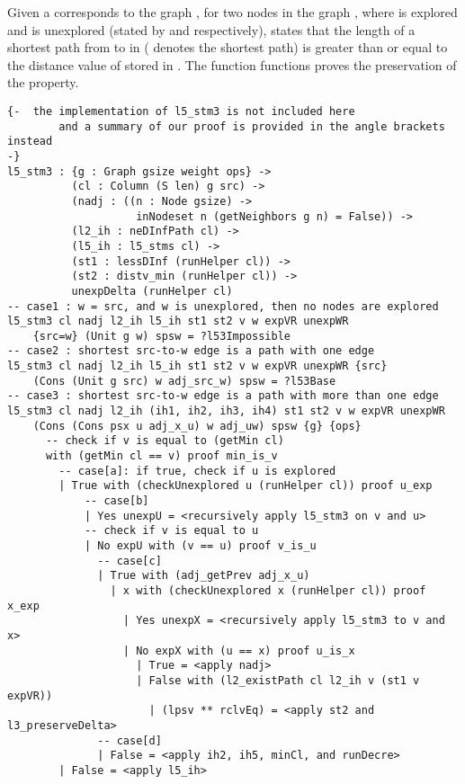 Given a   corresponds to the graph , for two nodes  in the graph , where  is explored and  is unexplored (stated by  and  respectively),  states that the length of a shortest path from  to  in ( denotes the shortest path) is greater than or equal to the distance value of  stored in . The function  functions proves the preservation of the  property. 
\begin{lstlisting}
{-  the implementation of l5_stm3 is not included here 
		and a summary of our proof is provided in the angle brackets instead
-}
l5_stm3 : {g : Graph gsize weight ops} ->
          (cl : Column (S len) g src) ->
          (nadj : ((n : Node gsize) -> 
          			inNodeset n (getNeighbors g n) = False)) ->
          (l2_ih : neDInfPath cl) ->
          (l5_ih : l5_stms cl) ->
          (st1 : lessDInf (runHelper cl)) ->
          (st2 : distv_min (runHelper cl)) ->
          unexpDelta (runHelper cl)
-- case1 : w = src, and w is unexplored, then no nodes are explored
l5_stm3 cl nadj l2_ih l5_ih st1 st2 v w expVR unexpWR 
	{src=w} (Unit g w) spsw = ?l53Impossible
-- case2 : shortest src-to-w edge is a path with one edge
l5_stm3 cl nadj l2_ih l5_ih st1 st2 v w expVR unexpWR {src} 
	(Cons (Unit g src) w adj_src_w) spsw = ?l53Base
-- case3 : shortest src-to-w edge is a path with more than one edge
l5_stm3 cl nadj l2_ih (ih1, ih2, ih3, ih4) st1 st2 v w expVR unexpWR 
	(Cons (Cons psx u adj_x_u) w adj_uw) spsw {g} {ops}
	  -- check if v is equal to (getMin cl)
	  with (getMin cl == v) proof min_is_v
	  	-- case[a]: if true, check if u is explored 
	    | True with (checkUnexplored u (runHelper cl)) proof u_exp
	    	-- case[b]
	        | Yes unexpU = <recursively apply l5_stm3 on v and u>
	        -- check if v is equal to u
	        | No expU with (v == u) proof v_is_u 
	          -- case[c]
	          | True with (adj_getPrev adj_x_u)
	            | x with (checkUnexplored x (runHelper cl)) proof x_exp
	              | Yes unexpX = <recursively apply l5_stm3 to v and x>
	              | No expX with (u == x) proof u_is_x
	                | True = <apply nadj>
	                | False with (l2_existPath cl l2_ih v (st1 v expVR))
	                  | (lpsv ** rclvEq) = <apply st2 and l3_preserveDelta>
	          -- case[d]
	          | False = <apply ih2, ih5, minCl, and runDecre> 
	    | False = <apply l5_ih>
\end{lstlisting}

